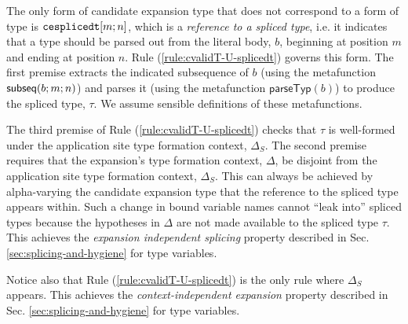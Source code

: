 The only form of candidate expansion type that does not correspond to a form of type is $\texttt{cesplicedt}[m; n]$, which is a \emph{reference to a spliced type}, i.e. it indicates that a type should be parsed out from the literal body, $b$, beginning at position $m$ and ending at position $n$. Rule (\ref{rule:cvalidT-U-splicedt}) governs this form. The first premise extracts the indicated subsequence of $b$ (using the metafunction $\mathsf{subseq}(b; m; n)$) and parses it (using the metafunction $\mathsf{parseTyp}(b)$) to produce the spliced type, $\tau$. We assume sensible definitions of these metafunctions.

 The third premise of Rule (\ref{rule:cvalidT-U-splicedt}) checks that $\tau$ is well-formed under the application site type formation context, $\Delta_S$. The second premise requires that the expansion's type formation context, $\Delta$, be disjoint from the application site type formation context, $\Delta_S$. This can always be achieved by alpha-varying the candidate expansion type that the reference to the spliced type appears within. Such a change in bound variable names cannot ``leak into'' spliced types because the hypotheses in $\Delta$ are not made available to the spliced type $\tau$. This achieves the \emph{expansion independent splicing} property described in Sec. \ref{sec:splicing-and-hygiene} for type variables.

Notice also that Rule (\ref{rule:cvalidT-U-splicedt}) is the only rule where $\Delta_S$ appears. This achieves the \emph{context-independent expansion} property described in Sec. \ref{sec:splicing-and-hygiene} for type variables.

